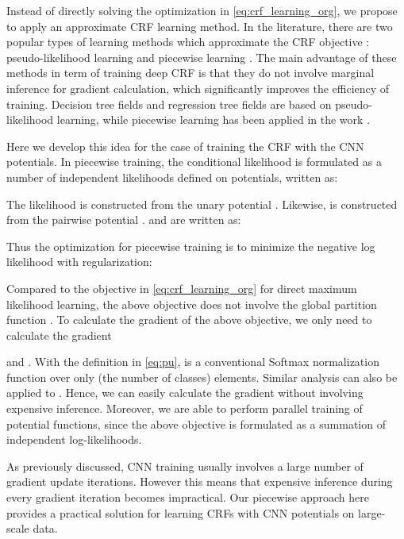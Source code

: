 Instead of directly solving the optimization in \eqref{eq:crf_learning_org},
we propose to apply an approximate CRF learning method.
In the literature,
there are two popular types of learning methods which approximate the CRF objective
: pseudo-likelihood learning \cite{besag1977efficiency} and piecewise learning \cite{SuttonM05}.
The main advantage of these methods  in term of training deep CRF is that they  do not involve marginal inference for gradient calculation,
which significantly improves the efficiency of training.
Decision tree fields \cite{NowozinRBSYK11} and regression tree fields \cite{jancsary2012regression}
are based on pseudo-likelihood learning, while
piecewise learning has been applied in the work \cite{SuttonM05,kolesnikov2014closed}.

Here we develop this idea for the case of training the CRF with the CNN potentials.
In piecewise training, 
the conditional likelihood 
is formulated as a number of independent likelihoods defined on potentials, written as:

The likelihood  is constructed from the unary potential .
Likewise,  is constructed from the pairwise potential .
 and  are written as:

 Thus the optimization for piecewise training is to minimize
 the negative log likelihood with regularization:

Compared to the objective in \eqref{eq:crf_learning_org} for direct maximum likelihood learning,
the above objective does not involve the global partition function .
To calculate the gradient of the above objective,
we only need to calculate the gradient

and
.
With the definition in \eqref{eq:pu},  is a conventional Softmax normalization function over only  (the number of classes) elements. 
Similar analysis can also be applied to .
Hence, we can easily calculate the gradient without involving expensive inference.
Moreover, we are able to perform parallel training of potential functions, since the above objective is formulated as a summation of independent log-likelihoods.

 As previously discussed, CNN training usually involves a large number of gradient update iterations.  However this means that expensive inference during every gradient iteration becomes impractical.  Our piecewise approach here provides a practical solution for learning CRFs with CNN potentials on large-scale data.





